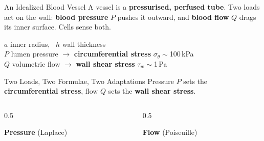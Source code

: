 \begin{frame}[t]{An Idealized Blood Vessel}
  A vessel is a \textbf{pressurised, perfused tube}. Two loads act on the wall:
  \textbf{blood pressure} $P$ pushes it outward, and \textbf{blood flow} $Q$ drags
  its inner surface. Cells sense both.
  \vfill
  \begin{center}\idealvessel[0.60]\end{center}
  \vfill
  \begin{center}\small
  $a$ inner radius, \ $h$ wall thickness\\
  $P$ lumen pressure $\to$ \textbf{circumferential stress} $\sigma_\theta\sim$100\,kPa\\
  $Q$ volumetric flow $\to$ \textbf{wall shear stress} $\tau_w\sim$1\,Pa\\
  \end{center}
\end{frame}

\begin{frame}[t]{Two Loads, Two Formulae, Two Adaptations}
  Pressure $P$ sets the \textbf{circumferential stress}, flow $Q$ sets the \textbf{wall shear
  stress}.
  \vfill
  \begin{columns}[T]
    \begin{column}{0.5\textwidth}
      \begin{center}\textbf{\color{YaleBlue} Pressure} (Laplace)\end{center}
    \end{column}
    \begin{column}{0.5\textwidth}
      \begin{center}\textbf{\color{YaleBlue} Flow} (Poiseuille)\end{center}
    \end{column}
  \end{columns}
  \vfill
\end{frame}

